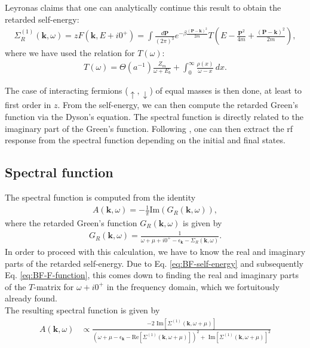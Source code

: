 \documentclass{article}
\theoremstyle{definition}
\newcommand{\f}[2]{\frac{#1}{#2}}
\newcommand{\lp}{\left(}
\newcommand{\rp}{\right)}
\begin{document}
Leyronas claims that one can analytically continue this result to obtain the retarded self-energy:
\begin{align*}
\Sigma_R^{(1)} (\mathbf{k}, \omega) = z F(\mathbf{k}, E + i0^+)  = 
\int \f{d\mathbf{P}}{(2\pi)^3} e^{-\beta \frac{(\mathbf{P} - \mathbf{k})^2}{2m}} 
T\lp E - \frac{\mathbf{P}^2}{4m} + \frac{(\mathbf{P} - \mathbf{k})^2}{2m} \rp,
\end{align*}
where we have used the relation for $T(\omega)$:
\begin{align*}
T(\omega) = \Theta(a^{-1})\frac{Z_m}{\omega + E_b} + \int_0^\infty \frac{\rho(x)}{\omega - x}\,dx.
\end{align*}



\noindent The case of interacting fermions ($\uparrow, \downarrow$) of equal masses is then done, at least to first order in $z$. From the self-energy, we can then compute the retarded Green's function via the Dyson's equation. The spectral function is directly related to the imaginary part of the Green's function. Following \cite{haussmann2009spectral}, one can then extract the rf response from the spectral function depending on the initial and final states. 


\subsection{Spectral function}

The spectral function is computed from the identity
\begin{align}
A(\mathbf{k}, \omega) = -\f{1}{\pi}\text{Im}(G_R(\mathbf{k}, \omega)),
\end{align}
where the retarded Green's function $G_R(\mathbf{k}, \omega)$ is given by 
\begin{align}
G_R(\mathbf{k}, \omega) = \f{1}{\omega + \mu + i0^+ - \epsilon_\mathbf{k} - \Sigma_R(\mathbf{k}, \omega)}.
\end{align}
In order to proceed with this calculation, we have to know the real and imaginary parts of the retarded self-energy. Due to  Eq. \eqref{eq:BF-self-energy} and subsequently Eq. \eqref{eq:BF-F-function}, this comes down to finding the real and imaginary parts of the $T$-matrix for $\omega + i0^+$ in the frequency domain, which we fortuitously already found.\\

\noindent The resulting spectral function is given by 
\begin{align}
A(\mathbf{k}, \omega) 
&\propto
\frac
{-2 \text{ Im}[\Sigma^{(1)}(\mathbf{k}, \omega + \mu)]}
{
(\omega + \mu -\epsilon_\mathbf{k} - \text{Re}[\Sigma^{(1)}(\mathbf{k}, \omega + \mu)])^2 
+
\text{ Im}[\Sigma^{(1)}(\mathbf{k}, \omega + \mu)]^2
}
\end{align}
\end{document}
